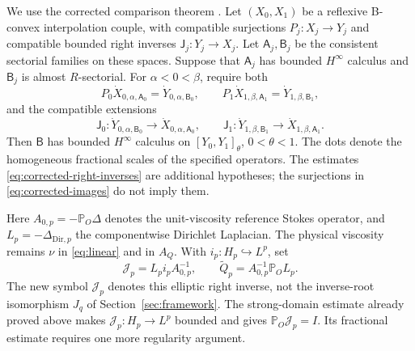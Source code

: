 \documentclass[11pt]{article}
\numberwithin{equation}{section}
\theoremstyle{remark}
\newcommand{\PP}{\mathbb P}
\begin{document}
We use the corrected comparison theorem
\cite[Theorem 1.3]{KWErratum}. Let $(X_0,X_1)$ be a reflexive
B-convex interpolation couple, with compatible surjections
$P_j:X_j\to Y_j$ and compatible bounded right inverses
$\mathsf J_j:Y_j\to X_j$. Let $\mathsf A_j,\mathsf B_j$ be the
consistent sectorial families on these spaces. Suppose that
$\mathsf A_j$ has bounded $H^\infty$ calculus and $\mathsf B_j$ is
almost $R$-sectorial. For $\alpha<0<\beta$, require both
\begin{equation}\label{eq:corrected-images}
 P_0\dot X_{0,\alpha,\mathsf A_0}
   =\dot Y_{0,\alpha,\mathsf B_0},\qquad
 P_1\dot X_{1,\beta,\mathsf A_1}
   =\dot Y_{1,\beta,\mathsf B_1},
\end{equation}
and the compatible extensions
\begin{equation}\label{eq:corrected-right-inverses}
 \mathsf J_0:\dot Y_{0,\alpha,\mathsf B_0}
                 \longrightarrow\dot X_{0,\alpha,\mathsf A_0},\qquad
 \mathsf J_1:\dot Y_{1,\beta,\mathsf B_1}
                 \longrightarrow\dot X_{1,\beta,\mathsf A_1}.
\end{equation}
Then $\mathsf B$ has bounded $H^\infty$ calculus on
$[Y_0,Y_1]_\theta$, $0<\theta<1$. The dots denote the homogeneous
fractional scales of the specified operators. The estimates
\eqref{eq:corrected-right-inverses} are additional hypotheses; the
surjections in \eqref{eq:corrected-images} do not imply them.

Here $A_{0,p}=-\PP_O\Delta$ denotes the unit-viscosity reference
Stokes operator, and $L_p=-\Delta_{\mathrm{Dir},p}$ the componentwise
Dirichlet Laplacian. The physical viscosity remains $\nu$ in
\eqref{eq:linear} and in $A_Q$. With $i_p:H_p\hookrightarrow L^p$,
set
\begin{equation}\label{eq:channel-right-inverse}
 \mathcal J_p=L_pi_pA_{0,p}^{-1},\qquad
 \widetilde Q_p=A_{0,p}^{-1}\PP_OL_p.
\end{equation}
The new symbol $\mathcal J_p$ denotes this elliptic right inverse,
not the inverse-root isomorphism $J_q$ of Section~\ref{sec:framework}.
The strong-domain estimate already proved above makes
$\mathcal J_p:H_p\to L^p$ bounded and gives
$\PP_O\mathcal J_p=I$. Its fractional estimate requires one more
regularity argument.
\end{document}
